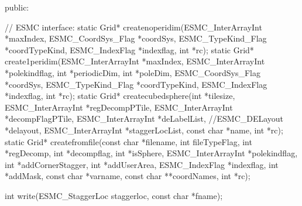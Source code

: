 {{ 
 
  public:
 
   // ESMC interface:
   static Grid* createnoperidim(ESMC_InterArrayInt *maxIndex, 
                                ESMC_CoordSys_Flag *coordSys,
                                ESMC_TypeKind_Flag *coordTypeKind,
                                ESMC_IndexFlag *indexflag,
                                int *rc);
   static Grid* create1peridim(ESMC_InterArrayInt *maxIndex, 
                               ESMC_InterArrayInt *polekindflag,
                               int *periodicDim, int *poleDim,
                               ESMC_CoordSys_Flag *coordSys,
                               ESMC_TypeKind_Flag *coordTypeKind, 
                               ESMC_IndexFlag *indexflag,
                               int *rc);
   static Grid* createcubedsphere(int *tilesize,
                                  ESMC_InterArrayInt *regDecompPTile,
                                  ESMC_InterArrayInt *decompFlagPTile,
                                  ESMC_InterArrayInt *deLabelList,
                                  //ESMC_DELayout *delayout,
                                  ESMC_InterArrayInt *staggerLocList,
                                  const char *name,
                                  int *rc);
   static Grid* createfromfile(const char *filename, int fileTypeFlag, 
                               int *regDecomp, int *decompflag,
                               int *isSphere, ESMC_InterArrayInt *polekindflag,
                               int *addCornerStagger,
                               int *addUserArea, ESMC_IndexFlag *indexflag,
                               int *addMask, const char *varname,
                               const char **coordNames, int *rc);
 
   int write(ESMC_StaggerLoc staggerloc, const char *fname);
 
}}
